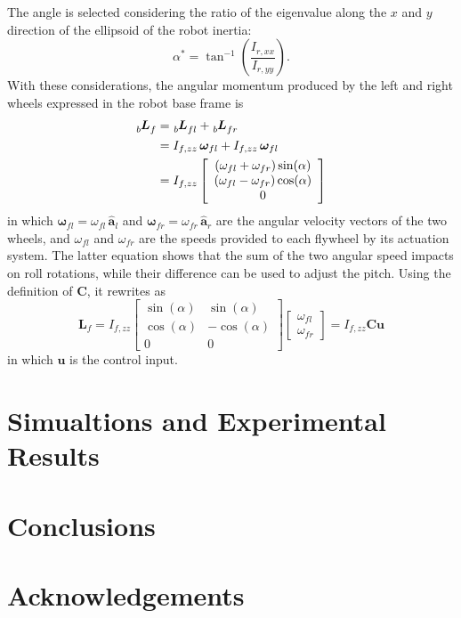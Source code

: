 \documentclass[journal,letterpaper]{IEEEtran}
\begin{document}
The angle is selected considering the ratio of the eigenvalue along the $x$ and $y$ direction of the ellipsoid of the robot inertia:
\begin{equation*}
\alpha^{*}=\tan^{-1}\left(\dfrac{I_{r, xx}}{I_{r, yy}}\right).
\end{equation*}
With these considerations, the angular momentum produced by the left and right wheels expressed in the robot base frame is
\begin{equation}
\begin{split}
\tensor[_b]{\bm{L}}{_f} &= \tensor[_b]{\bm{L}}{_{fl}} + \tensor[_b]{\bm{L}}{_{fr}} \\
&=I_{f, zz} \, \bm{\omega}_{fl} + I_{f, zz} \, \bm{\omega}_{fl}\\
&=I_{f, zz}
\left[\begin{array}{c}
 \left(\omega_{fl} +  \omega_{fr}\right)\sin(\alpha) \\ 
 \left(\omega_{fl} -  \omega_{fr}\right)\cos(\alpha) \\
 0
\end{array}\right]
\end{split}
\end{equation}
in which $\bm{\omega}_{fl}= \omega_{fl} \, \hat{\bm{a}}_{l}$ and $\bm{\omega}_{fr}= \omega_{fr} \, \hat{\bm{a}}_{r}$ are the angular velocity vectors of the two wheels, and $\omega_{fl}$ and $\omega_{fr}$ are the speeds provided to each flywheel by its actuation system. The latter equation shows that the sum of the two angular speed impacts on roll rotations, while their difference can be used to adjust the pitch. Using the definition of $\bm{C}$, it rewrites as
\begin{equation}
\bm{L}_f = I_{f,zz}
\left[
\begin{array}{cc}
\sin(\alpha) & \sin(\alpha) \\
\cos(\alpha) & -\cos(\alpha) \\
0 & 0
\end{array}
\right]
\left[
\begin{array}{cc}
\omega_{fl} \\
\omega_{fr}
\end{array}
\right] = I_{f,zz} \bm{C} \bm{u}
\end{equation}
in which $\bm{u}$ is the control input.
\section{Simualtions and Experimental Results}



\section{Conclusions}
\label{sec:conclusion}

\small
\section*{Acknowledgements}	



\printbibliography
\end{document}
